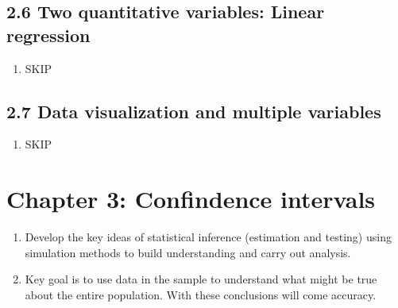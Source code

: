 \documentclass{article}
\begin{document}
\subsection{2.6 Two quantitative variables: Linear regression}
\begin{enumerate}

\item SKIP

\end{enumerate}

\subsection{2.7 Data visualization and multiple variables}
\begin{enumerate}

\item SKIP

\end{enumerate}


\section{Chapter 3: Confindence intervals}

\begin{enumerate}
\item Develop the key ideas of statistical inference (estimation and testing) using simulation methods to build understanding and carry out analysis.
\item Key goal is to use data in the sample to understand what might be true about the entire population. With these conclusions will come accuracy.
\end{enumerate}

\end{document}
